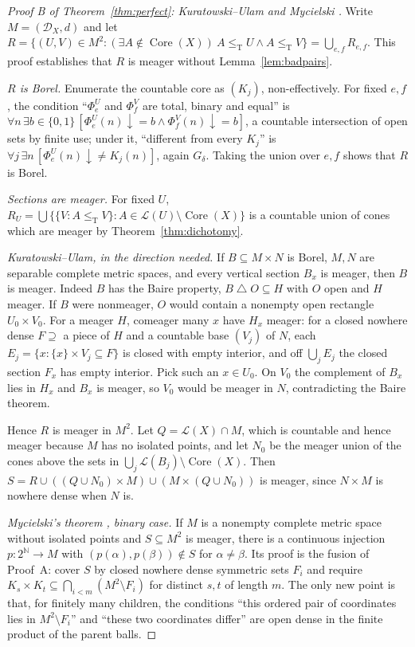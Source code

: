 \documentclass[11pt,letterpaper]{article}
\theoremstyle{definition}
\numberwithin{equation}{section}
\newcommand{\N}{\mathbb N}
\newcommand{\Cantor}{2^{\N}}
\newcommand{\leT}{\le_{\mathrm T}}
\newcommand{\DX}[1]{\mathcal D_{#1}}
\newcommand{\Low}{\mathcal L}
\newcommand{\Core}{\operatorname{Core}}
\newcommand{\sd}{\mathbin{\triangle}}
\newcommand{\dn}{{\downarrow}}
\newcommand{\src}[1]{\leavevmode{\sffamily\footnotesize\color{Steel}[#1]}}
\newenvironment{proofA}[1]{\begin{proof}[#1]}{\end{proof}}
\begin{document}
\begin{proofA}{Proof B of Theorem~\ref{thm:perfect}: Kuratowski--Ulam and Mycielski \src{R8}}
Write $M=(\DX X,d)$ and let $R=\{(U,V)\in M^2:(\exists A\notin\Core(X))\ A\leT U\wedge A\leT V\}=\bigcup_{e,f}R_{e,f}$. This proof establishes that $R$ is meager without Lemma~\ref{lem:badpairs}.

\emph{$R$ is Borel.} Enumerate the countable core as $(K_j)$, non-effectively. For fixed $e,f$, the condition ``$\Phi_e^U$ and $\Phi_f^V$ are total, binary and equal'' is $\forall n\,\exists b\in\{0,1\}\,[\Phi_e^U(n)\dn=b\wedge\Phi_f^V(n)\dn=b]$, a countable intersection of open sets by finite use; under it, ``different from every $K_j$'' is $\forall j\,\exists n\,[\Phi_e^U(n)\dn\ne K_j(n)]$, again $G_\delta$. Taking the union over $e,f$ shows that $R$ is Borel.

\emph{Sections are meager.} For fixed $U$, $R_U=\bigcup\{\{V:A\leT V\}:A\in\Low(U)\setminus\Core(X)\}$ is a countable union of cones which are meager by Theorem~\ref{thm:dichotomy}.

\emph{Kuratowski--Ulam, in the direction needed.} If $B\subseteq M\times N$ is Borel, $M,N$ are separable complete metric spaces, and every vertical section $B_x$ is meager, then $B$ is meager. Indeed $B$ has the Baire property, $B\sd O\subseteq H$ with $O$ open and $H$ meager. If $B$ were nonmeager, $O$ would contain a nonempty open rectangle $U_0\times V_0$. For a meager $H$, comeager many $x$ have $H_x$ meager: for a closed nowhere dense $F\supseteq$ a piece of $H$ and a countable base $(V_j)$ of $N$, each $E_j=\{x:\{x\}\times V_j\subseteq F\}$ is closed with empty interior, and off $\bigcup_jE_j$ the closed section $F_x$ has empty interior. Pick such an $x\in U_0$. On $V_0$ the complement of $B_x$ lies in $H_x$ and $B_x$ is meager, so $V_0$ would be meager in $N$, contradicting the Baire theorem.

Hence $R$ is meager in $M^2$. Let $Q=\Low(X)\cap M$, which is countable and hence meager because $M$ has no isolated points, and let $N_0$ be the meager union of the cones above the sets in $\bigcup_j\Low(B_j)\setminus\Core(X)$. Then $S=R\cup((Q\cup N_0)\times M)\cup(M\times(Q\cup N_0))$ is meager, since $N\times M$ is nowhere dense when $N$ is.

\emph{Mycielski's theorem \cite{Mycielski}, binary case.} If $M$ is a nonempty complete metric space without isolated points and $S\subseteq M^2$ is meager, there is a continuous injection $p:\Cantor\to M$ with $(p(\alpha),p(\beta))\notin S$ for $\alpha\ne\beta$. Its proof is the fusion of Proof~A: cover $S$ by closed nowhere dense symmetric sets $F_i$ and require $K_s\times K_t\subseteq\bigcap_{i<m}(M^2\setminus F_i)$ for distinct $s,t$ of length $m$. The only new point is that, for finitely many children, the conditions ``this ordered pair of coordinates lies in $M^2\setminus F_i$'' and ``these two coordinates differ'' are open dense in the finite product of the parent balls.


\end{proofA}
\end{document}
